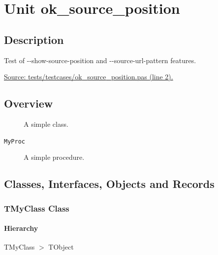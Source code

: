 \documentclass{report}
\newif\ifpdf
\begin{document}
\label{toc}\tableofcontents
\newpage
\newlength{\tmplength}
\chapter{Unit ok{\_}source{\_}position}
\label{ok_source_position}
\section{Description}
Test of {-}{-}show{-}source{-}position and {-}{-}source{-}url{-}pattern features.\par
\href{https://github.com/pasdoc/pasdoc/blob/master/tests/testcases/ok_source_position.pas#L2}{Source: tests/testcases/ok{\_}source{\_}position.pas (line 2).}
\section{Overview}
\begin{description}
\item[\texttt{\begin{ttfamily}TMyClass\end{ttfamily} Class}]A simple class.
\end{description}
\begin{description}
\item[\texttt{MyProc}]A simple procedure.
\end{description}
\section{Classes, Interfaces, Objects and Records}
\ifpdf
\subsection*{\large{\textbf{TMyClass Class}}\normalsize\hspace{1ex}\hrulefill}
\else
\subsection*{TMyClass Class}
\fi
\label{ok_source_position.TMyClass}
\subsubsection*{\large{\textbf{Hierarchy}}\normalsize\hspace{1ex}\hfill}
TMyClass {$>$} TObject
\end{document}
